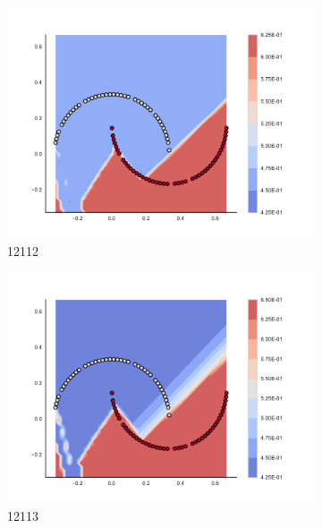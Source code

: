\begin{figure}[h]
\begin{subfigure}[b]{0.09\textwidth}
    \includegraphics[clip, trim=2.35cm 1.75cm 4.5cm 0cm,width=\textwidth]{img/convergence/12112.pdf}
    \caption{12112}
    \label{fig:convergence_12112}
\end{subfigure}
%
\begin{subfigure}[b]{0.09\textwidth}
    \includegraphics[clip, trim=2.35cm 1.75cm 4.5cm 0cm,width=\textwidth]{img/convergence/12113.pdf}
    \caption{12113}
    \label{fig:convergence_12113}
\end{subfigure}
%
\begin{subfigure}[b]{0.09\textwidth}

\end{subfigure}
\end{figure}

